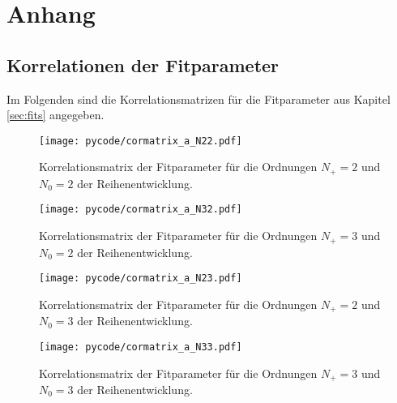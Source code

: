 \chapter{Anhang}

\section{Korrelationen der Fitparameter}
Im Folgenden sind die Korrelationsmatrizen für die Fitparameter aus Kapitel \ref{sec:fits} angegeben.
\begin{figure}
  \centering
  \texttt{[image: pycode/cormatrix\_a\_N22.pdf]}
  \caption{Korrelationsmatrix der Fitparameter für die Ordnungen $N_+ = \num{2}$ und $N_0 = \num{2}$ der Reihenentwicklung.}
  \label{fig:fitcor22}
\end{figure}

\begin{figure}
  \centering
  \texttt{[image: pycode/cormatrix\_a\_N32.pdf]}
  \caption{Korrelationsmatrix der Fitparameter für die Ordnungen $N_+ = \num{3}$ und $N_0 = \num{2}$ der Reihenentwicklung.}
  \label{fig:fitcor32}
\end{figure}

\begin{figure}
  \centering
  \texttt{[image: pycode/cormatrix\_a\_N23.pdf]}
  \caption{Korrelationsmatrix der Fitparameter für die Ordnungen $N_+ = \num{2}$ und $N_0 = \num{3}$ der Reihenentwicklung.}
  \label{fig:fitcor23}
\end{figure}

\begin{figure}
  \centering
  \texttt{[image: pycode/cormatrix\_a\_N33.pdf]}
  \caption{Korrelationsmatrix der Fitparameter für die Ordnungen $N_+ = \num{3}$ und $N_0 = \num{3}$ der Reihenentwicklung.}
  \label{fig:fitcor33}
\end{figure}

